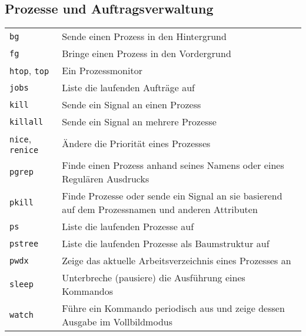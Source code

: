 \documentclass[10pt,a4paper]{article}
\begin{document}
\begin{multicols}{2}
\section{Prozesse und Auftragsverwaltung}
\begin{tabular}{ p{2.5cm} p{8.5cm} }
  \hline
  \texttt{bg} & Sende einen Prozess in den Hintergrund \\
  \texttt{fg} & Bringe einen Prozess in den Vordergrund \\
  \texttt{htop}, \texttt{top} & Ein Prozessmonitor \\
  \texttt{jobs} & Liste die laufenden Aufträge auf \\
  \texttt{kill} & Sende ein Signal an einen Prozess \\
  \texttt{killall} & Sende ein Signal an mehrere Prozesse\\
  \texttt{nice}, \texttt{renice} & Ändere die Priorität eines Prozesses \\
  \texttt{pgrep} & Finde einen Prozess anhand seines Namens oder eines Regulären Ausdrucks \\
  \texttt{pkill} & Finde Prozesse oder sende ein Signal an sie basierend auf dem Prozessnamen und anderen Attributen\\
  \texttt{ps} & Liste die laufenden Prozesse auf \\
  \texttt{pstree} & Liste die laufenden Prozesse als Baumstruktur auf \\
  \texttt{pwdx} & Zeige das aktuelle Arbeitsverzeichnis eines Prozesses an \\
  \texttt{sleep} & Unterbreche (pausiere) die Ausführung eines Kommandos \\
  \texttt{watch} & Führe ein Kommando periodisch aus und zeige dessen Ausgabe im Vollbildmodus \\
  \hline
\end{tabular}


\end{multicols}
\end{document}
